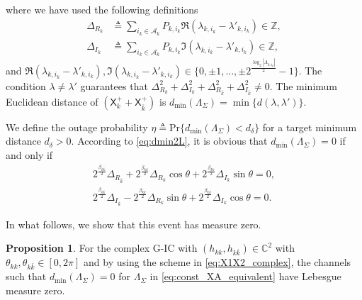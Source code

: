 \documentclass[12pt, draftclsnofoot, onecolumn]{IEEEtran}
\newcommand{\msf}[1]{\mathsf{#1}}
\theoremstyle{definition}
\newtheorem{proposition}{Proposition}
\begin{document}
where we have used the following definitions
\begin{align}
\Delta_{R_k} &\triangleq \sum_{i_k \in\mathcal{A}_k}P_{k,i_k}\Re(\lambda_{k,i_k}-\lambda'_{k,i_k}) \in \mathbb{Z} , \label{eq:delta_R}\\
\Delta_{I_k} &\triangleq \sum_{i_k \in\mathcal{A}_k}P_{k,i_k}\Im(\lambda_{k,i_k}-\lambda'_{k,i_k}) \in \mathbb{Z},\label{eq:delta_I}
\end{align}
and $\Re(\lambda_{k,i_k}-\lambda'_{k,i_k}),\Im(\lambda_{k,i_k}-\lambda'_{k,i_k}) \in \{0,\pm 1,\ldots, \pm 2^{\frac{\log_2|\Lambda_{k,i_k}|}{2}}-1\}$. The condition $\lambda \neq \lambda'$ guarantees that $\Delta_{R_k}^2+\Delta_{I_k}^2+\Delta_{R_{\bar{k}}}^2+\Delta_{I_{\bar{k}}}^2 \neq 0$. The minimum Euclidean distance of $(\msf{X}_k^{+}+\msf{X}_{\bar{k}}^{+})$ is $d_{\min}(\Lambda_{\Sigma}) = \min\{d(\lambda,\lambda')\}$.

We define the outage probability $\eta\triangleq \text{Pr}\{d_{\min}(\Lambda_{\Sigma}) < d_{\delta} \}$ for a target minimum distance $d_{\delta}>0$.
According to \eqref{eq:dmin2L}, it is obvious that $d_{\min}(\Lambda_{\Sigma}) =0$ if and only if
\begin{align}
2^{\frac{\beta_{k{\bar{k}}}}{2}}\Delta_{R_{\bar{k}}}+2^{\frac{\beta_{kk}}{2}}\Delta_{R_k}\cos\theta+2^{\frac{\beta_{kk}}{2}}\Delta_{I_k}\sin\theta = 0, \label{sol_1a} \\
2^{\frac{\beta_{k\bar{k}}}{2}}\Delta_{I_{\bar{k}}} -2^{\frac{\beta_{kk}}{2}}\Delta_{R_k}\sin\theta+2^{\frac{\beta_{kk}}{2}}\Delta_{I_k}\cos\theta = 0. \label{sol_1b}
\end{align}

In what follows, we show that this event has measure zero.

\begin{proposition}\label{prop:zero}
For the complex G-IC with $(h_{kk},h_{k\bar{k}}) \in \mathbb{C}^2$ with $\theta_{kk},\theta_{k\bar{k}}\in [0,2\pi]$ and by using the scheme in \eqref{eq:X1X2_complex}, the channels such that $d_{\min}(\Lambda_{\Sigma})=0$ for $\Lambda_{\Sigma}$ in \eqref{eq:const_XA_equivalent} have Lebesgue measure zero.
\end{proposition}
\end{document}
